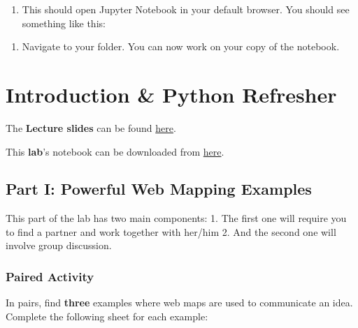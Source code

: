 \documentclass[
  letterpaper,
  DIV=11,
  numbers=noendperiod]{scrreprt}
\providecommand{\tightlist}{%
  \setlength{\itemsep}{0pt}\setlength{\parskip}{0pt}}\usepackage{longtable,booktabs,array}
\begin{document}
\begin{enumerate}
\def\labelenumi{\arabic{enumi}.}
\setcounter{enumi}{5}
\tightlist
\item
  This should open Jupyter Notebook in your default browser. You should
  see something like this:
\end{enumerate}

\begin{enumerate}
\def\labelenumi{\arabic{enumi}.}
\setcounter{enumi}{6}
\tightlist
\item
  Navigate to your folder. You can now work on your copy of the
  notebook.
\end{enumerate}


\chapter{Introduction \& Python
Refresher}\label{introduction-python-refresher}

The \textbf{Lecture slides} can be found
\href{https://slides.com/gfilo/web-mapping-and-geovisualisation-envs456/fullscreen}{here}.

This \textbf{lab}'s notebook can be downloaded from
\href{https://github.com/GDSL-UL/wma/blob/main/labs/w01_intro.ipynb}{here}.

\section{Part I: Powerful Web Mapping
Examples}\label{part-i-powerful-web-mapping-examples}

This part of the lab has two main components: 1. The first one will
require you to find a partner and work together with her/him 2. And the
second one will involve group discussion.

\subsection{Paired Activity}\label{paired-activity}

In pairs, find \textbf{three} examples where web maps are used to
communicate an idea. Complete the following sheet for each example:
\end{document}
